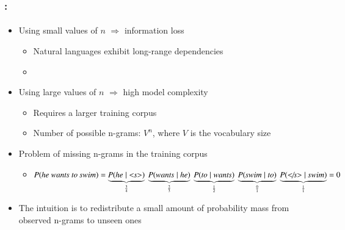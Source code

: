 \documentclass[xcolor=table]{beamer}
\begin{document}
\begin{frame}
	\frametitle{\insertshortsubtitle: \insertsection}
	\framesubtitle{\insertsubsection}
	
	\begin{itemize}
		
		\item Using small values of $n$ $\Longrightarrow$ information loss
		\begin{itemize}
			\item Natural languages exhibit long-range dependencies
			\item {}
		\end{itemize}
		
		\item Using large values of $n$ $\Longrightarrow$ high model complexity
		\begin{itemize}
			\item Requires a larger training corpus
			\item Number of possible n-grams: $V^n$, where $V$ is the vocabulary size
		\end{itemize}
		
		\item Problem of missing n-grams in the training corpus
		\begin{itemize}
			\item $P(\textit{he wants to swim}) = 
			\underbrace{P(\textit{he} \mid \textit{\textless s\textgreater})}_{\frac{3}{4}}\ 
			\underbrace{P(\textit{wants} \mid \textit{he})}_{\frac{2}{3}}\ 
			\underbrace{P(\textit{to} \mid \textit{wants})}_{\frac{1}{2}}\ 
			\underbrace{P(\textit{swim} \mid \textit{to})}_{\frac{0}{1}}\ 
			\underbrace{P(\textit{\textless/s\textgreater} \mid \textit{swim})}_{\frac{1}{1}} = 0$
		\end{itemize}
		
		\item The intuition is to redistribute a small amount of probability mass from observed n-grams to unseen ones
	\end{itemize}
	
\end{frame}
\end{document}

